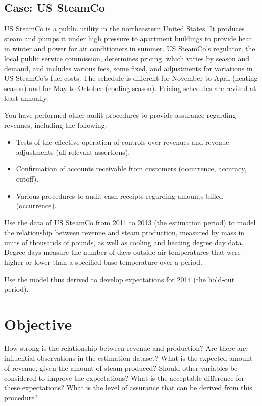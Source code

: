 \begin{mdframed}[hidealllines=true,backgroundcolor=KPMG_blue!20]
\section*{Case: US SteamCo}
\label{case:ussteamco_ch07}

US SteamCo is a public utility in the northeastern United States. It produces steam and pumps it under high pressure to apartment buildings to provide heat in winter and power for air conditioners in summer. US SteamCo's regulator, the local public service commission, determines pricing, which varies by season and demand, and includes various fees, some fixed, and adjustments for variations in US SteamCo's fuel costs. The schedule is different for November to April (heating season) and for May to October (cooling season). Pricing schedules are revised at least annually.

\bigskip
You have performed other audit procedures to provide assurance regarding revenues, including the following:

\begin{itemize}
\item Tests of the effective operation of controls over revenues and revenue adjustments (all relevant assertions).
\item Confirmation of accounts receivable from customers (occurrence, accuracy, cutoff).
\item Various procedures to audit cash receipts regarding amounts billed (occurrence).
\end{itemize}

\bigskip
Use the data of US SteamCo from 2011 to 2013 (the estimation period) to model the relationship between revenue and steam production, measured by mass in units of thousands of pounds, as well as cooling and heating degree day data. Degree days measure the number of days outside air temperatures that were higher or lower than a specified base temperature over a period.

Use the model thus derived to develop expectations for 2014 (the hold-out period).

\end{mdframed}

\section*{Objective}
How strong is the relationship between revenue and production? Are there any influential observations in the estimation dataset? What is the expected amount of revenue, given the amount of steam produced? Should other variables be considered to improve the expectations? What is the acceptable difference for these expectations? What is the level of assurance that can be derived from this procedure?

